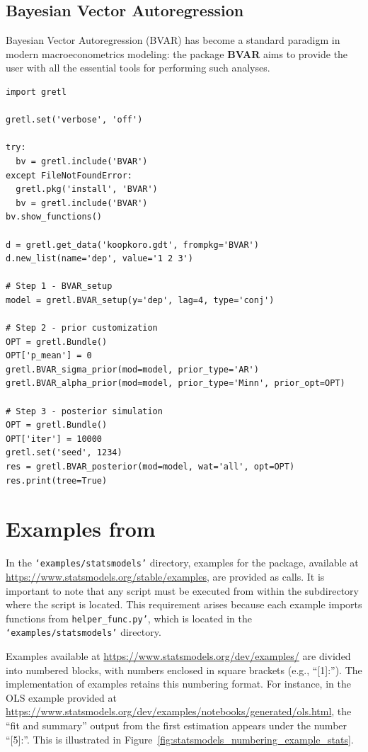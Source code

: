 \subsection{Bayesian Vector Autoregression}\label{sec.bvar}
Bayesian Vector Autoregression (BVAR) has become a standard
paradigm in modern macroeconometrics modeling: the \gretl package
\textbf{BVAR} aims to provide the user with all the essential
tools for performing such analyses.
\begin{lstlisting}[style=pythonstylefoot]
import gretl

gretl.set('verbose', 'off')

try:
  bv = gretl.include('BVAR')
except FileNotFoundError:
  gretl.pkg('install', 'BVAR')
  bv = gretl.include('BVAR')
bv.show_functions()

d = gretl.get_data('koopkoro.gdt', frompkg='BVAR')
d.new_list(name='dep', value='1 2 3')

# Step 1 - BVAR_setup
model = gretl.BVAR_setup(y='dep', lag=4, type='conj')

# Step 2 - prior customization
OPT = gretl.Bundle()
OPT['p_mean'] = 0
gretl.BVAR_sigma_prior(mod=model, prior_type='AR')
gretl.BVAR_alpha_prior(mod=model, prior_type='Minn', prior_opt=OPT)

# Step 3 - posterior simulation
OPT = gretl.Bundle()
OPT['iter'] = 10000
gretl.set('seed', 1234)
res = gretl.BVAR_posterior(mod=model, wat='all', opt=OPT)
res.print(tree=True)
\end{lstlisting}


\section{Examples from }\label{sec:examples.statsmodels}
In the \texttt{`examples/statsmodels'} directory, examples
for the  package, available at
\url{https://www.statsmodels.org/stable/examples},
are provided as \gretlpy calls. It is important to note
that any \python script must be executed from within the
subdirectory where the script is located. This requirement
arises because each example imports functions from
\texttt{helper\_func.py'}, which is located in the
\texttt{`examples/statsmodels'} directory.

Examples available at \url{https://www.statsmodels.org/dev/examples/}
are divided into numbered blocks, with numbers enclosed
in square brackets (e.g., ``[1]:''). The \gretlpy implementation
of  examples retains this numbering format.
For instance, in the OLS example provided at
\url{https://www.statsmodels.org/dev/examples/notebooks/generated/ols.html},
the ``fit and summary'' output from the first estimation
appears under the number ``[5]:''. This is illustrated in
Figure~\ref{fig:statsmodels_numbering_example_stats}.

